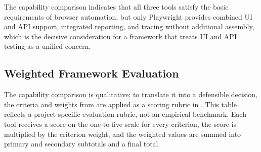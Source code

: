 The capability comparison indicates that all three tools satisfy the basic requirements of browser automation, but only Playwright provides combined UI and API support, integrated reporting, and tracing without additional assembly, which is the decisive consideration for a framework that treats UI and API testing as a unified concern.

\subsection{Weighted Framework Evaluation}
\label{subsec:ch5-weighted-framework-evaluation}

The capability comparison is qualitative; to translate it into a defensible decision, the criteria and weights from  are applied as a scoring rubric in . This table reflects a project-specific evaluation rubric, not an empirical benchmark. Each tool receives a score on the one-to-five scale for every criterion, the score is multiplied by the criterion weight, and the weighted values are summed into primary and secondary subtotals and a final total.

